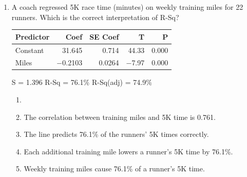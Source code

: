 \documentclass[12pt]{article}
\begin{document}
\begin{enumerate}[leftmargin=1.9em, itemsep=0.13in]
  \boxguard[12]
  \item \begin{minipage}[t]{0.42\linewidth}\raggedright
        A coach regressed 5K race time (minutes) on weekly training miles for 22 runners.
        Which is the correct interpretation of R-Sq?
        \end{minipage}\hfill
        \begin{minipage}[t]{0.56\linewidth}
        \centering\footnotesize\ttfamily
        \begin{tabular}[t]{@{} l r r r r @{}}
        Predictor & Coef & SE Coef & T & P \\ \hline
        Constant & 31.645 & 0.714 & 44.33 & 0.000 \\
        Miles & $-$0.2103 & 0.0264 & $-$7.97 & 0.000 \\
        \end{tabular}\par
        S = 1.396 \quad R-Sq = 76.1\% \quad R-Sq(adj) = 74.9\%\par
        \end{minipage}
        \begin{enumerate}[label=\textbf{(\Alph*)}, leftmargin=2.2em, itemsep=2pt]
          \item {}
          \item The correlation between training miles and 5K time is 0.761.
          \item The line predicts 76.1\% of the runners' 5K times correctly.
          \item Each additional training mile lowers a runner's 5K time by 76.1\%.
          \item Weekly training miles cause 76.1\% of a runner's 5K time.\hfill{}\rule[-0.2in]{0pt}{0.48in}
        \end{enumerate}


\end{enumerate}
\end{document}
